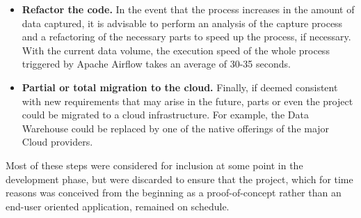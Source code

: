 \begin{itemize}
	\item \textbf{Refactor the code.} In the event that the process increases in the amount of data captured, it is advisable to perform an analysis of the capture process and a refactoring of the necessary parts to speed up the process, if necessary. With the current data volume, the execution speed of the whole process triggered by Apache Airflow takes an average of 30-35 seconds.
	\item \textbf{Partial or total migration to the cloud.} Finally, if deemed consistent with new requirements that may arise in the future, parts or even the project could be migrated to a cloud infrastructure. For example, the Data Warehouse could be replaced by one of the native offerings of the major Cloud providers.
\end{itemize}

\nonzeroparskip Most of these steps were considered for inclusion at some point in the development phase, but were discarded to ensure that the project, which for time reasons was conceived from the beginning as a proof-of-concept rather than an end-user oriented application, remained on schedule.
